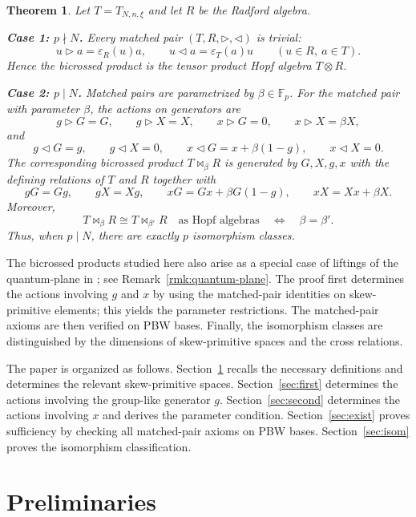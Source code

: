 \documentclass[twoside,11pt]{amsart}
\newtheorem{thm}[defi]{Theorem}
\newcommand{\F}{\mathbb{F}}
\begin{document}
	\begin{thm}\label{thm:main}
		Let $T=T_{N,n,\xi}$ and let $R$ be the Radford algebra.
		
		\medskip
		\noindent\textbf{Case 1: $p\nmid N$.}
		Every matched pair $(T,R,\triangleright,\triangleleft)$ is trivial:
		\[
		u\triangleright a=\varepsilon_R(u)a,
		\qquad
		u\triangleleft a=\varepsilon_T(a)u
		\qquad (u\in R,\ a\in T).
		\]
		Hence the bicrossed product is the tensor product Hopf algebra $T\otimes R$.
		
		\medskip
		\noindent\textbf{Case 2: $p\mid N$.}
		Matched pairs are parametrized by $\beta\in\F_p$. For the matched pair with
		parameter $\beta$, the actions on generators are
		\[
		g\triangleright G=G,\qquad g\triangleright X=X,
		\qquad x\triangleright G=0,\qquad x\triangleright X=\beta X,
		\]
		and
		\[
		g\triangleleft G=g,\qquad g\triangleleft X=0,
		\qquad x\triangleleft G=x+\beta(1-g),
		\qquad x\triangleleft X=0.
		\]
		The corresponding bicrossed product $T\bowtie_\beta R$ is generated by
		$G,X,g,x$ with the defining relations of $T$ and $R$ together with
		\[
		gG=Gg,\qquad gX=Xg,\qquad
		xG=Gx+\beta G(1-g),\qquad xX=Xx+\beta X.
		\]
		Moreover,
		\[
		T\bowtie_\beta R\cong T\bowtie_{\beta'}R
		\quad\text{as Hopf algebras}
		\quad\Longleftrightarrow\quad
		\beta=\beta'.
		\]
		Thus, when $p\mid N$, there are exactly $p$ isomorphism classes.
	\end{thm}
	
	The bicrossed products studied here also arise as a special case of
	liftings of the quantum-plane in \cite{Xpq2}; see
	Remark~\ref{rmk:quantum-plane}. The proof first determines the actions involving $g$ and $x$ by using the
	matched-pair identities on skew-primitive elements; this yields the
	parameter restrictions. The matched-pair axioms are then verified on PBW
	bases. Finally, the isomorphism classes are distinguished by the
	dimensions of skew-primitive spaces and the cross relations. 
	
	The paper is organized as follows. Section~\ref{sec:prelim} recalls the 
	necessary definitions and determines the relevant skew-primitive spaces. 
	Section~\ref{sec:first} determines the actions involving the group-like 
	generator $g$. Section~\ref{sec:second} determines the actions involving 
	$x$ and derives the parameter condition. Section~\ref{sec:exist} proves 
	sufficiency by checking all matched-pair axioms on PBW bases. 
	Section~\ref{sec:isom} proves the isomorphism classification.
	
	
	\section{Preliminaries}\label{sec:prelim}
	
\end{document}
